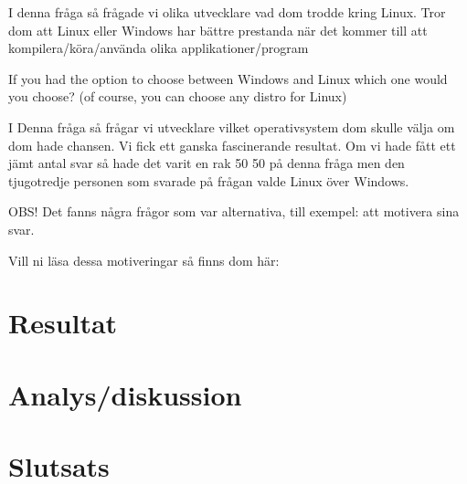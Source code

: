 \documentclass[12pt, a4paper]{report}
\begin{document}
   \normalsize I denna fråga så frågade vi olika utvecklare vad dom trodde kring Linux. Tror dom att Linux eller Windows har bättre prestanda när det kommer till att kompilera/köra/använda olika applikationer/program
 
 
   \vspace{1cm}
 
 
   \cite{form}
   \vspace{3cm}
 
   \large{If you had the option to choose between Windows and Linux which one would you choose? (of course, you can choose any distro for Linux)}
  
   \vspace{.5cm}
  
   \normalsize I Denna fråga så frågar vi utvecklare vilket operativsystem dom skulle välja om dom hade chansen. Vi fick ett ganska fascinerande resultat. Om vi hade fått ett jämt antal svar så hade det varit en rak 50 50 på denna fråga men den tjugotredje personen som svarade på frågan valde Linux över Windows.
 
   \vspace{1cm}
 
 
   \cite{form}
 
   \vspace{1cm}
 
 
   \small{OBS! Det fanns några frågor som var alternativa, till exempel: att motivera sina svar.
  
   Vill ni läsa dessa motiveringar så finns dom här:} 
 

\section{Resultat}

\section{Analys/diskussion}



\section{Slutsats}


\printbibliography
\end{document}
